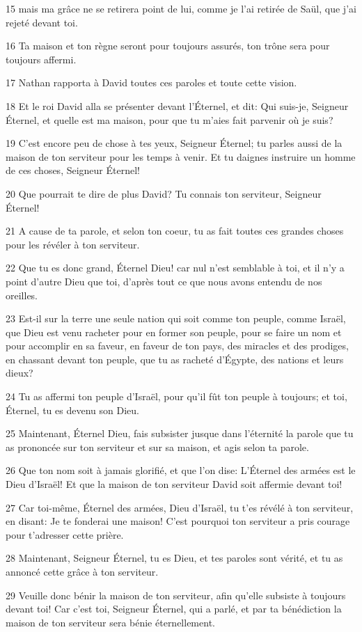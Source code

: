 \par 15 mais ma grâce ne se retirera point de lui, comme je l'ai retirée de Saül, que j'ai rejeté devant toi.
\par 16 Ta maison et ton règne seront pour toujours assurés, ton trône sera pour toujours affermi.
\par 17 Nathan rapporta à David toutes ces paroles et toute cette vision.
\par 18 Et le roi David alla se présenter devant l'Éternel, et dit: Qui suis-je, Seigneur Éternel, et quelle est ma maison, pour que tu m'aies fait parvenir où je suis?
\par 19 C'est encore peu de chose à tes yeux, Seigneur Éternel; tu parles aussi de la maison de ton serviteur pour les temps à venir. Et tu daignes instruire un homme de ces choses, Seigneur Éternel!
\par 20 Que pourrait te dire de plus David? Tu connais ton serviteur, Seigneur Éternel!
\par 21 A cause de ta parole, et selon ton coeur, tu as fait toutes ces grandes choses pour les révéler à ton serviteur.
\par 22 Que tu es donc grand, Éternel Dieu! car nul n'est semblable à toi, et il n'y a point d'autre Dieu que toi, d'après tout ce que nous avons entendu de nos oreilles.
\par 23 Est-il sur la terre une seule nation qui soit comme ton peuple, comme Israël, que Dieu est venu racheter pour en former son peuple, pour se faire un nom et pour accomplir en sa faveur, en faveur de ton pays, des miracles et des prodiges, en chassant devant ton peuple, que tu as racheté d'Égypte, des nations et leurs dieux?
\par 24 Tu as affermi ton peuple d'Israël, pour qu'il fût ton peuple à toujours; et toi, Éternel, tu es devenu son Dieu.
\par 25 Maintenant, Éternel Dieu, fais subsister jusque dans l'éternité la parole que tu as prononcée sur ton serviteur et sur sa maison, et agis selon ta parole.
\par 26 Que ton nom soit à jamais glorifié, et que l'on dise: L'Éternel des armées est le Dieu d'Israël! Et que la maison de ton serviteur David soit affermie devant toi!
\par 27 Car toi-même, Éternel des armées, Dieu d'Israël, tu t'es révélé à ton serviteur, en disant: Je te fonderai une maison! C'est pourquoi ton serviteur a pris courage pour t'adresser cette prière.
\par 28 Maintenant, Seigneur Éternel, tu es Dieu, et tes paroles sont vérité, et tu as annoncé cette grâce à ton serviteur.
\par 29 Veuille donc bénir la maison de ton serviteur, afin qu'elle subsiste à toujours devant toi! Car c'est toi, Seigneur Éternel, qui a parlé, et par ta bénédiction la maison de ton serviteur sera bénie éternellement.


